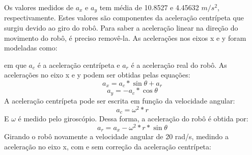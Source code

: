 \documentclass[
	12pt,				%
	openright,			%
	twoside,			%
	convert,
	a4paper,			%
	english,			%
	french,				%
	spanish,			%
	brazil				%
	]{abntex2}
\begin{document}
Os valores medidos de $a_x$ e $a_y$ tem média de 10.8527 e 4.45632 $m/s^2$, respectivamente. Estes valores são componentes da aceleração centrípeta que surgiu devido ao giro do robô. Para saber a aceleração linear na direção do movimento do robô, é preciso removê-la. As acelerações nos eixos x e y foram modeladas como:
\begin{center}
\end{center}
em que $a_c$ é a aceleração centrípeta e $a_r$ é a aceleração real do robô. As acelerações no eixo x e y podem ser obtidas pelas equações:
\begin{equation}
	a_x = a_c * \sin{\theta} + a_r
\end{equation}
\begin{equation}
	a_y = - a_c * \cos{\theta}
\end{equation}
A aceleração centrípeta pode ser escrita em função da velocidade angular:
\begin{equation}
	a_c = \omega^2 * r
\end{equation}
E $\omega$ é medido pelo giroscópio. Dessa forma, a aceleração do robô é obtida por:
\begin{equation}
	a_r = a_x - \omega^2 * r * \sin{\theta}
\end{equation}
Girando o robô novamente a velocidade angular de 20 rad/s, medindo a aceleração no eixo x, com e sem correção da aceleração centrípeta:
\end{document}

